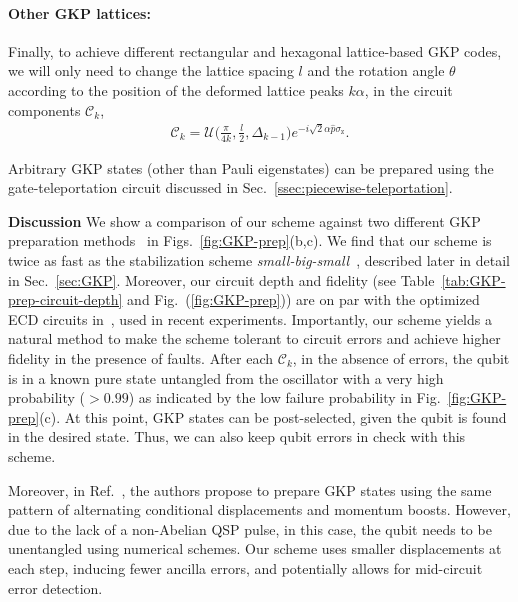 \documentclass[aps,prx,showpacs,notitlepage,twocolumn,superscriptaddress,nofootinbib,preprintnumbers,floatfix,10pt, longbibliography]{revtex4-2}
\begin{document}
\paragraph{Other GKP lattices:} Finally, to achieve different rectangular and hexagonal lattice-based GKP codes, we will only need to change the lattice spacing $l$ and the rotation angle $\theta$ according to the position of the deformed lattice peaks $k\alpha$, in the circuit components $\mathcal{C}_k$,
\begin{align}
  \mathcal{C}_k=\mathcal{U}\Bigg(\frac{\pi}{4k},\frac{l}{2},\Delta_{k-1}\Bigg)e^{-i\sqrt{2}\alpha\hat p\sigma_\mathrm{z}}.
\end{align}

Arbitrary GKP states (other than Pauli eigenstates) can be prepared using the gate-teleportation circuit discussed in Sec.~\ref{ssec:piecewise-teleportation}.

\par\textbf{Discussion} We show a comparison of our scheme against two different GKP preparation methods~\cite{eickbusch2022fast,royer2020stabilization,de2022error} in Figs.~\ref{fig:GKP-prep}(b,c). We find that our scheme is twice as fast as the stabilization scheme \emph{small-big-small}~\cite{royer2020stabilization,de2022error}, described later in detail in Sec.~\ref{sec:GKP}. Moreover, our circuit depth and fidelity (see Table~\ref{tab:GKP-prep-circuit-depth} and Fig.~(\ref{fig:GKP-prep})) are on par with the optimized E\textrm{CD} circuits in~\cite{eickbusch2022fast}, used in recent experiments. Importantly, our scheme yields a natural method to make the scheme tolerant to circuit errors and achieve higher fidelity in the presence of faults. After each $\mathcal{C}_k$, in the absence of errors, the qubit is in a known pure state untangled from the oscillator with a very high probability ($>0.99$) as indicated by the low failure probability in Fig.~\ref{fig:GKP-prep}(c). At this point, GKP states can be post-selected, given the qubit is found in the desired state. Thus, we can also keep qubit errors in check with this scheme. 

Moreover, in Ref.~\cite{hastrup2021measurement}, the authors propose to prepare GKP states using the same pattern of alternating conditional displacements and momentum boosts. However, due to the lack of a non-Abelian QSP pulse, in this case, the qubit needs to be unentangled using numerical schemes. Our scheme uses smaller displacements at each step, inducing fewer ancilla errors, and potentially allows for mid-circuit error detection.
\end{document}
